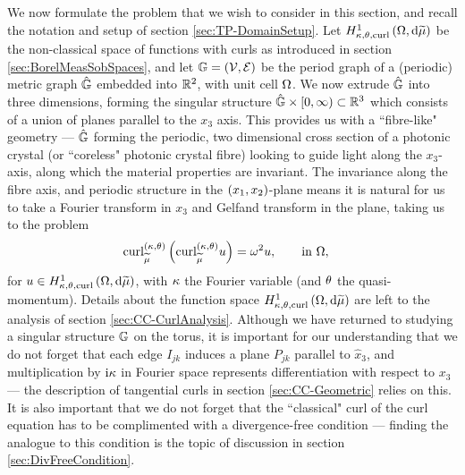 We now formulate the problem that we wish to consider in this section, and recall the notation and setup of section \ref{sec:TP-DomainSetup}.
Let $H^1_{\kappa,\theta,\mathrm{curl}}\left( \Omega, \mathrm{d}\widetilde{\mu} \right)$ be the non-classical space of functions with curls as introduced in section \ref{sec:BorelMeasSobSpaces}, and let $\mathbb{G}=\left( \mathcal{V},\mathcal{E} \right)$ be the period graph of a (periodic) metric graph $\hat{\mathbb{G}}$ embedded into $\mathbb{R}^2$, with unit cell $\Omega$.
We now extrude $\hat{\mathbb{G}}$ into three dimensions, forming the singular structure $\hat{\mathbb{G}}\times[0,\infty)\subset\mathbb{R}^3$ which consists of a union of planes parallel to the $x_3$ axis.
This provides us with a ``fibre-like" geometry --- $\hat{\mathbb{G}}$ forming the periodic, two dimensional cross section of a photonic crystal (or ``coreless" photonic crystal fibre) looking to guide light along the $x_3$-axis, along which the material properties are invariant.
The invariance along the fibre axis, and periodic structure in the $\left( x_1,x_2 \right)$-plane means it is natural for us to take a Fourier transform in $x_3$ and Gelfand transform in the plane, taking us to the problem
\begin{align} \label{eq:SingularCurlEquation}
	\mathrm{curl}_{\widetilde{\mu}}^{\left( \kappa, \theta \right)}\left(  \mathrm{curl}_{\widetilde{\mu}}^{\left( \kappa, \theta \right)}u  \right) &= \omega^2 u,
	\qquad \text{in } \Omega,
\end{align}
for $u\in H^1_{\kappa,\theta,\mathrm{curl}}\left( \Omega, \mathrm{d}\widetilde{\mu} \right)$, with $\kappa$ the Fourier variable (and $\theta$ the quasi-momentum).
Details about the function space $H^1_{\kappa,\theta,\mathrm{curl}}\left( \Omega, \mathrm{d}\widetilde{\mu} \right)$ are left to the analysis of section \ref{sec:CC-CurlAnalysis}.
Although we have returned to studying a singular structure $\mathbb{G}$ on the torus, it is important for our understanding that we do not forget that each edge $I_{jk}$ induces a plane $P_{jk}$ parallel to $\widehat{x}_3$, and multiplication by $\mathrm{i}\kappa$ in Fourier space represents differentiation with respect to $x_3$ --- the description of tangential curls in section \ref{sec:CC-Geometric} relies on this.
It is also important that we do not forget that the ``classical" curl of the curl equation has to be complimented with a divergence-free condition --- finding the analogue to this condition is the topic of discussion in section \ref{sec:DivFreeCondition}.

